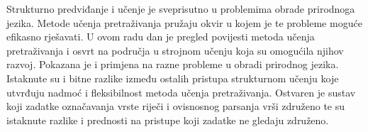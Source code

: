 \begin{sazetak}
Strukturno predviđanje i učenje je sveprisutno u problemima obrade prirodnoga
jezika. Metode učenja pretraživanja pružaju okvir u kojem je te probleme moguće
efikasno rješavati. U ovom radu dan je pregled povijesti metoda učenja
pretraživanja i osvrt na područja u strojnom učenju koja su omogućila njihov
razvoj. Pokazana je i primjena na razne probleme u obradi prirodnog jezika.
Istaknute su i bitne razlike između ostalih pristupa strukturnom učenju koje
utvrđuju nadmoć i fleksibilnost metoda učenja pretraživanja. Ostvaren je
sustav koji zadatke označavanja vrste riječi i ovisnosnog parsanja vrši
združeno te su istaknute razlike i prednosti na pristupe koji zadatke ne gledaju
združeno.

\end{sazetak}
